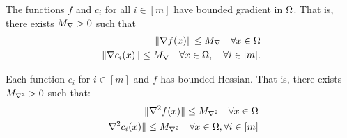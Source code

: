 
\begin{assumption}
\label{bounded_gradients_lemma}
The functions $f$ and $c_i$ for all $ i \in [m]$ have bounded gradient in $ \Omega $.
That is, there exists ${M_{\nabla}} > 0$ such that
\begin{align*}
\|\nabla f(x)\| \le {M_{\nabla}} \quad  \forall x \in \Omega \\
\|\nabla c_i(x)\| \le {M_{\nabla}} \quad  \forall x \in \Omega, \quad \forall i \in [m].
\end{align*}
\end{assumption}

\begin{assumption}
\label{bounded_hessians_assumption}
Each function $c_i$ for $i \in [m]$ and $f$ has bounded Hessian. That is, there exists $ {M_{\nabla^2}} > 0$ such that:
\begin{align*}
\|\nabla^2 f(x) \| \le {M_{\nabla^2}} \quad \forall x \in \Omega \\
\|\nabla^2 c_i(x) \| \le {M_{\nabla^2}} \quad \forall x \in \Omega, \forall i \in [m]
\end{align*}
\end{assumption}




